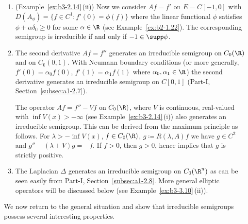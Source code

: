 \begin{examples}
\begin{enumerate}[\upshape (i), wide, labelindent=.25em]
	\item 
	(\cf Example~\ref{ex:b3-2.14}\,(ii)) Now we consider $Af = f'$ on $E = C[-1,0]$ with $D(A_{\phi}) = \{f \in C^1 \colon f'(0) = \phi(f)\}$ where the linear functional $\phi$ satisfies $\phi + \alpha\delta_{0} \geq 0$ for some $\alpha \in \R$ (see Example~\ref{ex:b2-1.22}).
	The corresponding semigroup is irreducible if and only if\/ $-1 \in \supp\phi$.
	
	\item 
	The second derivative $Af = f''$ generates an irreducible semigroup on $C_{0}(\R)$ and on $C_{0}(0,1)$.
	With Neumann boundary conditions (or more generally, $f'(0) = \alpha_{0}f(0)$, $f'(1) = \alpha_{1}f(1)$ where $\alpha_{0}, \alpha_{1} \in \R$) the second derivative generates an irreducible semigroup on $C[0,1]$ (\cf Part-I, Section~\ref{subsec:a1-2.7}).
	
	The operator $Af = f'' - Vf$ on $C_{0}(\R)$, where $V$ is continuous, real-valued with $\inf V(x) > -\infty$ (see Example~\ref{ex:b3-2.14}\,(i)) also generates an irreducible semigroup.
	This can be derived from the maximum principle as follows. 
    For $\lambda > -\inf V(x)$, $f \in C_{0}(\R)$, $g \coloneq R(\lambda,A)f$ we have $g \in C^2$ and $g'' - (\lambda + V)g = -f$.
	If\/ $f > 0$, then $g > 0$, hence \textcite[Chap.I, Theorem~3]{protterweinberger:1967} implies that $g$ is strictly positive.
	
	\item 
	The Laplacian 
    $\Delta$ generates an irreducible semigroup on $C_{0}(\R^n)$ as can be seen easily from Part-I, Section~\ref{subsec:a1-2.8}.
	More general elliptic operators will be discussed below (see Example~\ref{ex:b3-3.10}\,(ii)).
\end{enumerate}
\end{examples}
We now return to the general situation and show that irreducible semigroups possess several interesting properties.
